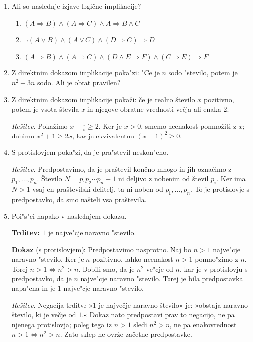 \documentclass[11pt,paper=b5,DIV=13,headinclude,footinclude]{scrbook}
\begin{document}
\begin{enumerate}
\item {\color{blue}Ali so naslednje izjave logične implikacije?}
\begin{enumerate}
\item[(i)] $(A \Rightarrow B ) \wedge (A \Rightarrow C) \wedge A \Rightarrow B \wedge C$
\item[(ii)] $\neg (A \vee B) \wedge (A\vee C) \wedge (D\Rightarrow C) \Rightarrow D$
\item[(iii)] $(A\Rightarrow B) \wedge (A\Rightarrow C) \wedge (D\wedge E \Rightarrow F) \wedge (C\Rightarrow E) \Rightarrow F$
\end{enumerate}

\item Z direktnim dokazom implikacije poka"zi: "Ce je $n$ sodo "stevilo, potem je $n^2 +3n$ sodo. Ali je obrat pravilen? 

\item Z direktnim dokazom implikacije pokaži: če je realno število $x$
pozitivno, potem je vsota števila $x$ in njegove obratne vrednosti večja
ali enaka $2$.

\emph{Rešitev.} Pokažimo $x+\frac{1}{x}\geq 2$. Ker je $x>0$, smemo
neenakost pomnožiti z $x$; dobimo $x^2+1\geq 2x$, kar je ekvivalentno
$(x-1)^2\geq 0$.

\item S protislovjem poka"zi, da je pra"stevil neskon"cno.

\emph{Rešitev.} Predpostavimo, da je praštevil končno mnogo in jih označimo
z $p_1,\ldots,p_n$. Število $N=p_1p_2\cdots p_n+1$ ni deljivo z nobenim
od števil $p_i$. Ker ima $N>1$ vsaj en praštevilski delitelj, ta ni
noben od $p_1,\ldots,p_n$. To je protislovje s predpostavko, da smo našteli
vsa praštevila.

\item Poi"s"ci napako v naslednjem dokazu. 

\textbf{Trditev:} $1$ je najve"cje naravno "stevilo. 

\textbf{Dokaz} (s protislovjem):
Predpostavimo nasprotno. Naj bo $n>1$ najve"cje naravno "stevilo. Ker je $n$ pozitivno, lahko neenakost $n>1$ pomno"zimo z $n$. Torej $n>1\Leftrightarrow n^2>n$. Dobili smo, da je $n^2$ ve"cje od $n$, kar je v protislovju s predpostavko, da je $n$ najve"cje naravno "stevilo. Torej je bila predpostavka napa"cna in je $1$ najve"cje naravno "stevilo.

\emph{Rešitev.} Negacija trditve »$1$ je največje naravno število« je:
»obstaja naravno število, ki je večje od $1$.« Dokaz nato predpostavi prav
to negacijo, ne pa njenega protislovja; poleg tega iz $n>1$ sledi $n^2>n$,
ne pa enakovrednost $n>1\Leftrightarrow n^2>n$. Zato sklep ne ovrže
začetne predpostavke.



\end{enumerate}
\end{document}
